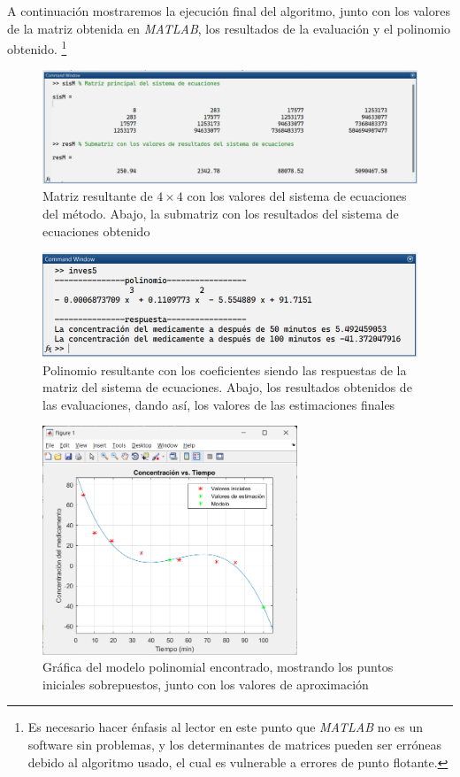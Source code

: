 \documentclass[11pt,letterpaper]{article}
\begin{document}
A continuación mostraremos la ejecución final del algoritmo, junto con los valores de la matriz obtenida en \textit{MATLAB}, los resultados de la evaluación  y el polinomio obtenido. \footnote{Es necesario hacer énfasis al lector en este punto que \textit{MATLAB} no es un software sin problemas, y los determinantes de matrices pueden ser erróneas debido al algoritmo usado, el cual es vulnerable a errores de punto flotante.}

\begin{figure}[H]
\centering
\includegraphics[width=5in]{mtz5.png}
\caption{Matriz resultante de $4\times 4$ con los valores del sistema de ecuaciones del método. Abajo, la submatriz con los resultados del sistema de ecuaciones obtenido}
\label{figure:mtz5}
\end{figure}

\begin{figure}[H]
\centering
\includegraphics[width=5in]{res5.png}
\caption{Polinomio resultante con los coeficientes siendo las respuestas de la matriz del sistema de ecuaciones. Abajo, los resultados obtenidos de las evaluaciones, dando así, los valores de las estimaciones finales}
\label{figure:res5}
\end{figure}
\begin{figure}[H]
\centering
\includegraphics[width=3in]{graf5.png}
\caption{Gráfica del modelo polinomial encontrado, mostrando los puntos iniciales sobrepuestos, junto con los valores de aproximación}
\label{figure:graf5.png}
\end{figure}




\end{document}
